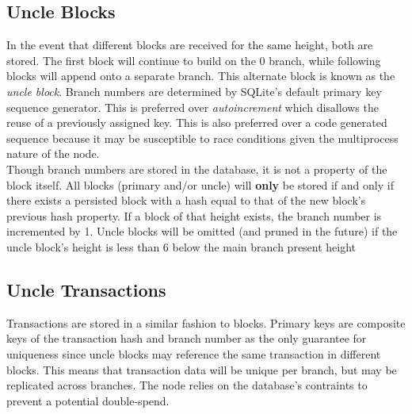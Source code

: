 \documentclass[10pt,twocolumn]{article}
\begin{document}
\subsection{Uncle Blocks}
In the event that different blocks are received for the same height, both are stored.  The first block will continue to build on the 0 branch, while following blocks will append onto a separate branch.  This alternate block is known as the \textit{uncle block}.  Branch numbers are determined by SQLite's default primary key sequence generator.  This is preferred over \textit{autoincrement} which disallows the reuse of a previously assigned key.  This is also preferred over a code generated sequence because it may be susceptible to race conditions given the multiprocess nature of the node.\\
Though branch numbers are stored in the database, it is not a property of the block itself.  All blocks (primary and/or uncle) will \textbf{only} be stored if and only if there exists a persisted block with a hash equal to that of the new block's previous hash property.  If a block of that height exists, the branch number is incremented by 1.  Uncle blocks will be omitted (and pruned in the future) if the uncle block's height is less than 6 below the main branch present height
\subsection{Uncle Transactions}
Transactions are stored in a similar fashion to blocks.  Primary keys are composite keys of the transaction hash and branch number as the only guarantee for uniqueness since uncle blocks may reference the same transaction in different blocks.  This means that transaction data will be unique per branch, but may be replicated across branches.  The node relies on the database's contraints to prevent a potential double-spend.
\end{document}
